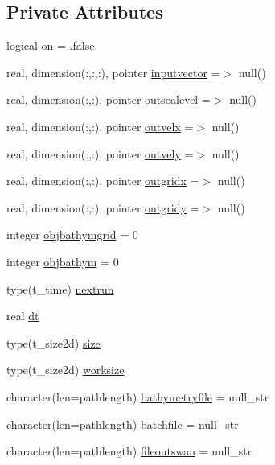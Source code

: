 \subsection*{Private Attributes}
\begin{DoxyCompactItemize}
\item 
logical \mbox{\hyperlink{structmodulewaves_1_1t__runswan_af4733855f6ac9d3bfebdf76fdb1e3e12}{on}} = .false.
\item 
real, dimension(\+:,\+:,\+:), pointer \mbox{\hyperlink{structmodulewaves_1_1t__runswan_abde0e6029298082078f74ca676231ea0}{inputvector}} =$>$ null()
\item 
real, dimension(\+:,\+:), pointer \mbox{\hyperlink{structmodulewaves_1_1t__runswan_a8110755a183f09661e8b684511aee2ca}{outsealevel}} =$>$ null()
\item 
real, dimension(\+:,\+:), pointer \mbox{\hyperlink{structmodulewaves_1_1t__runswan_a69956fc566b9e2dcefcb8830397dd658}{outvelx}} =$>$ null()
\item 
real, dimension(\+:,\+:), pointer \mbox{\hyperlink{structmodulewaves_1_1t__runswan_a8c5f1fb066a460cd95aed6979689fb42}{outvely}} =$>$ null()
\item 
real, dimension(\+:,\+:), pointer \mbox{\hyperlink{structmodulewaves_1_1t__runswan_aa3a1e78198fac6619adcf7805c20e389}{outgridx}} =$>$ null()
\item 
real, dimension(\+:,\+:), pointer \mbox{\hyperlink{structmodulewaves_1_1t__runswan_ab3a7c36a4d85030948ec6b28cb2d076e}{outgridy}} =$>$ null()
\item 
integer \mbox{\hyperlink{structmodulewaves_1_1t__runswan_a3a2b67876308c44d074e75456944f71a}{objbathymgrid}} = 0
\item 
integer \mbox{\hyperlink{structmodulewaves_1_1t__runswan_a0b5781fbe7f986197089bb6acc7a54a0}{objbathym}} = 0
\item 
type(t\+\_\+time) \mbox{\hyperlink{structmodulewaves_1_1t__runswan_a0faf904fe00c18801a9d211875429df9}{nextrun}}
\item 
real \mbox{\hyperlink{structmodulewaves_1_1t__runswan_a2f48944fca33b735b0b24bd2c677a8d0}{dt}}
\item 
type(t\+\_\+size2d) \mbox{\hyperlink{structmodulewaves_1_1t__runswan_ab33a46897bf0032110c59a5db5a18b6c}{size}}
\item 
type(t\+\_\+size2d) \mbox{\hyperlink{structmodulewaves_1_1t__runswan_aa6ed4f372e79c87d0f0b711ddb4e32e6}{worksize}}
\item 
character(len=pathlength) \mbox{\hyperlink{structmodulewaves_1_1t__runswan_af432c5d5a9f71be2c0c4662b06c3aefb}{bathymetryfile}} = null\+\_\+str
\item 
character(len=pathlength) \mbox{\hyperlink{structmodulewaves_1_1t__runswan_a8b10a84f8d567510ede1b29d88a7017a}{batchfile}} = null\+\_\+str
\item 
character(len=pathlength) \mbox{\hyperlink{structmodulewaves_1_1t__runswan_ac94a50e89c5b989ae5faf3e8aacdd970}{fileoutswan}} = null\+\_\+str
\end{DoxyCompactItemize}


